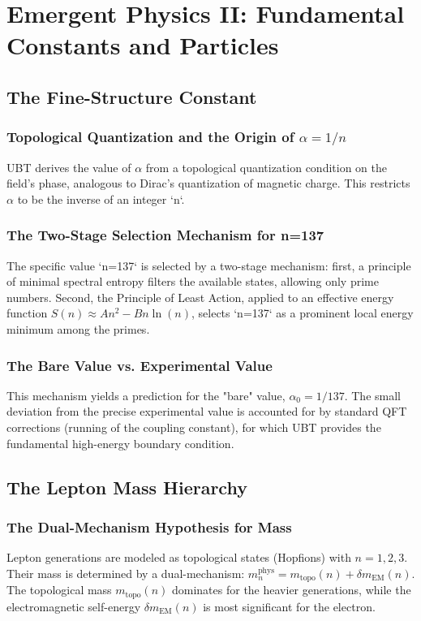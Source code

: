 \documentclass[12pt, a4paper]{article}
\begin{document}
\section{Emergent Physics II: Fundamental Constants and Particles}
\subsection{The Fine-Structure Constant}
\subsubsection{Topological Quantization and the Origin of \( \alpha = 1/n \)}
UBT derives the value of \( \alpha \) from a topological quantization condition on the field's phase, analogous to Dirac's quantization of magnetic charge. This restricts \( \alpha \) to be the inverse of an integer `n`.

\subsubsection{The Two-Stage Selection Mechanism for n=137}
The specific value `n=137` is selected by a two-stage mechanism: first, a principle of minimal spectral entropy filters the available states, allowing only prime numbers. Second, the Principle of Least Action, applied to an effective energy function \( S(n) \approx A n^2 - B n \ln(n) \), selects `n=137` as a prominent local energy minimum among the primes.

\subsubsection{The Bare Value vs. Experimental Value}
This mechanism yields a prediction for the "bare" value, \( \alpha_0 = 1/137 \). The small deviation from the precise experimental value is accounted for by standard QFT corrections (running of the coupling constant), for which UBT provides the fundamental high-energy boundary condition.

\subsection{The Lepton Mass Hierarchy}
\subsubsection{The Dual-Mechanism Hypothesis for Mass}
Lepton generations are modeled as topological states (Hopfions) with \( n=1,2,3 \). Their mass is determined by a dual-mechanism: \( m_n^{\text{phys}} = m_{\text{topo}}(n) + \delta m_{\text{EM}}(n) \). The topological mass \( m_{\text{topo}}(n) \) dominates for the heavier generations, while the electromagnetic self-energy \( \delta m_{\text{EM}}(n) \) is most significant for the electron.
\end{document}
